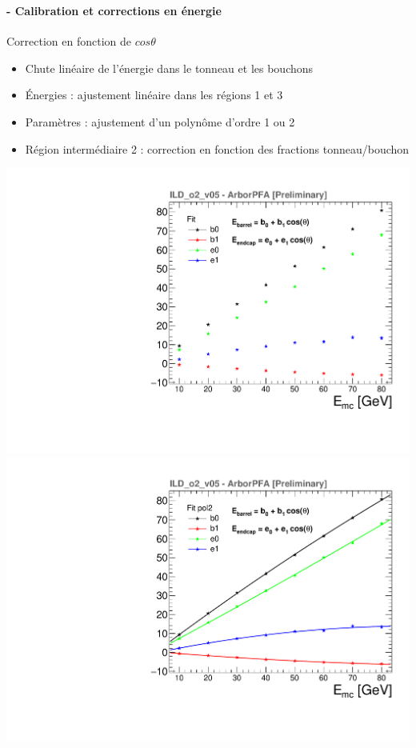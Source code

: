 \documentclass[8pt]{beamer}
\begin{document}
  \begin{frame}
  \frametitle{\secname}
  \framesubtitle{\subsecname - Calibration et corrections en énergie}
    \begin{minipage}{0.49\linewidth}
      \begin{block}{Correction en fonction de $cos\theta$}
        \begin{itemize}
          \item<1-> Chute linéaire de l'énergie dans le tonneau et les bouchons
          \item<2-> Énergies : ajustement linéaire  dans les régions 1 et 3
          \item<3-> Paramètres : ajustement d'un polynôme d'ordre 1 ou 2
          \item<4-> Région intermédiaire 2 : correction en fonction des fractions tonneau/bouchon
        \end{itemize}
      \end{block}
      \begin{center}
        \begin{overprint}
           \centering \includegraphics[width=0.8\linewidth]{ThetaCalibFit_nofit_thesis.pdf}
           \centering \includegraphics[width=0.8\linewidth]{ThetaCalibFit_pol2_thesis.pdf}

\end{overprint}
\end{center}
\end{minipage}
\end{frame}
\end{document}
